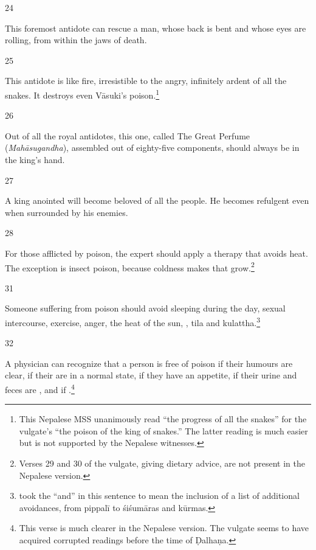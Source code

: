 \begin{translation}
\item [24]

This foremost antidote can rescue a man, whose back is bent and whose 
eyes are rolling, from within the jaws of death.

\item [25]

This antidote is like fire, irresistible to the angry, infinitely ardent 
 of 
all the snakes.  It destroys even Vāsuki's poison.\footnote{This Nepalese MSS 
unanimously read  “the progress of all the snakes” for 
the vulgate's  “the poison of the king of snakes.”  The 
latter reading is much easier but is not supported by the Nepalese witnesses.}

\item [26]

Out of all the royal antidotes, this one, called The Great Perfume
(\emph{Mahāsugandha}), assembled out of eighty-five components, 
should always be in the king's hand.

\item [27]

A king anointed  will become beloved of all the people.  He 
becomes refulgent even when surrounded by his enemies. 

\item [28]

For those afflicted by poison, the expert should apply a therapy that
avoids heat.  The exception is insect poison, because coldness
makes that grow.\footnote{Verses 29 and 30 of the vulgate, giving dietary 
advice, are not present in the Nepalese version.}

\item[31]

Someone suffering from poison should avoid 
sleeping during the day, sexual intercourse, exercise, anger, the heat of the 
sun, , \gls{tila} and 
\gls{kulattha}.\footnote{ took the “and” in this 
sentence to mean the inclusion of a list of additional avoidances, from 
\gls{pippalī} to 
\glspl{śiśumāra} and \glspl{kūrma}.}


\item[32]

A physician can recognize that a person is free of poison if their 
humours are clear, if their  are in a normal state, 
if they have an appetite, if their urine and feces are , and
if .\footnote{This 
verse is much clearer in the Nepalese version.  The vulgate seems to have 
acquired corrupted readings before the time of Ḍalhaṇa.}

\end{translation}
